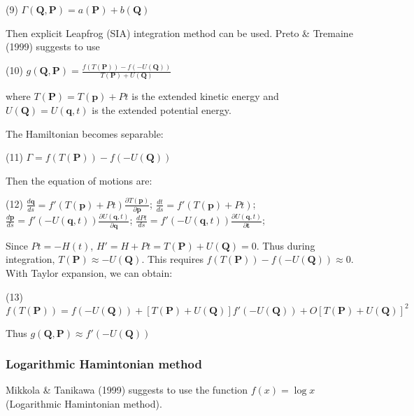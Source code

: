 (9) $ \Gamma(\mathbf{Q},\mathbf{P}) = a(\mathbf{P}) + b(\mathbf{Q}) $

Then explicit Leapfrog (S\+IA) integration method can be used. Preto \& Tremaine (1999) suggests to use

(10) $ g(\mathbf{Q},\mathbf{P}) = \frac{f(T(\mathbf{P})) - f(-U(\mathbf{Q}))}{T(\mathbf{P}) + U(\mathbf{Q})} $

where $ T(\mathbf{P}) = T(\mathbf{p}) + Pt $ is the extended kinetic energy and $ U(\mathbf{Q}) = U(\mathbf{q},t) $ is the extended potential energy.

The Hamiltonian becomes separable\+:

(11) $ \Gamma = f(T(\mathbf{P})) - f(-U(\mathbf{Q})) $

Then the equation of motions are\+:

(12) $ \frac{d \mathbf{q} }{d s} = f'(T(\mathbf{p})+Pt) \frac{\partial T(\mathbf{p})}{\partial {\mathbf{p}}} $; $ \frac{d t }{d s} = f'(T(\mathbf{p})+Pt) $; $ \frac{d \mathbf{p} }{d s} = f'(-U(\mathbf{q},t)) \frac{\partial U(\mathbf{q},t)}{\partial {\mathbf{q}}} $; $ \frac{d Pt}{d s} = f'(-U(\mathbf{q},t)) \frac{\partial U(\mathbf{q},t)}{\partial {\mathbf{t}}} $;

Since $Pt = -H(t)$, $H'=H+Pt = T(\mathbf{P}) + U(\mathbf{Q}) = 0 $. Thus during integration, $T(\mathbf{P}) \approx -U(\mathbf{Q}) $. This requires $ f(T(\mathbf{P})) - f(-U(\mathbf{Q})) \approx 0 $. With Taylor expansion, we can obtain\+:

(13) $ f(T(\mathbf{P})) = f(-U(\mathbf{Q})) + \left[T(\mathbf{P}) + U(\mathbf{Q})\right] f'(-U(\mathbf{Q})) + O\left[T(\mathbf{P}) + U(\mathbf{Q})\right]^2 $

Thus $ g(\mathbf{Q},\mathbf{P}) \approx f'(-U(\mathbf{Q})) $\hypertarget{index_logH_sec}{}\subsubsection{Logarithmic Hamintonian method}\label{index_logH_sec}
Mikkola \& Tanikawa (1999) suggests to use the function $ f(x) = \log{x} $ (Logarithmic Hamintonian method). 